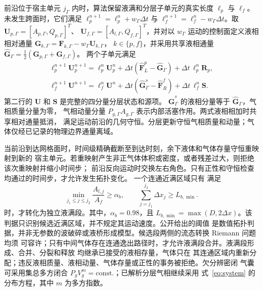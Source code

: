 前沿位于宿主单元 $j_\Gamma$ 内时，算法保留液满和分层子单元的真实长度
$\ell_p$ 与 $\ell_f$。未发生跨面时，它们满足
$\ell_p^{n+1}=\ell_p^n+w_\Gamma\Delta t$ 与
$\ell_f^{n+1}=\ell_f^n-w_\Gamma\Delta t$。取
$\mathbf U_{p,\Gamma}=[A_{p,\Gamma},Q_{p,\Gamma}]^{T}$、
$\mathbf U_{f,\Gamma}=[A_{l,\Gamma},Q_{f,\Gamma}]^{T}$，并对以
$w_\Gamma$ 运动的控制面定义液相相对通量
$\mathbf G_{k,\Gamma}=\mathbf F_{k,\Gamma}-w_\Gamma\mathbf U_{k,\Gamma}$，
$k\in\{p,f\}$，并采用共享液相通量
$\widehat{\mathbf G}_\Gamma=\tfrac12(\mathbf G_{p,\Gamma}+\mathbf G_{f,\Gamma})$。
两个子单元满足
\begin{equation}
\begin{gathered}
\ell_p^{n+1}\mathbf U_p^{n+1}
=\ell_p^n\mathbf U_p^n
+\Delta t(\widehat{\mathbf F}_{L}^{p}
-\widehat{\mathbf G}_\Gamma)
+\Delta t\,\ell_p^n\mathbf R_p,\\[3pt]
\ell_f^{n+1}\mathbf U^{n+1}
=\ell_f^n\mathbf U^n
+\Delta t(\widehat{\mathbf G}_\Gamma^{s}
-\widehat{\mathbf F}_{R}^{f})
+\Delta t\,\ell_f^n\mathbf S.
\end{gathered}
\label{eq:cutcell_update}
\end{equation}
第二行的 $\mathbf U$ 和 $\mathbf S$ 是完整的四分量分层状态和源项。
$\widehat{\mathbf G}_\Gamma^s$ 的液相分量等于 $\widehat{\mathbf G}_\Gamma$，气相质量分量为零，
气相动量分量 $P_{g,\Gamma}A_{g,\Gamma}$ 表示内部活塞作用。两式液相相加时共享相对通量抵消，
满足运动前沿的几何守恒。分层更新守恒气相质量和动量；气体仅经已记录的物理边界通量离域。

当前沿到达网格面时，时间级精确截断至到达时刻，余下液体和\mbox{气体存量}守恒重映射到新的
宿主单元。若重映射产生非正气体体积或密度，或者残差过大，则拒绝该次重映射并缩小时间步；
前沿反向运动时交换左右角色。只有正性和守恒检查均通过的时间步，才允许发生拓扑变化。
一个连通近满区域只有
满足
\begin{equation}
\min_{j_1\le j\le j_2}\frac{A_{l,j}}{A_f}\ge\alpha_b,
\qquad
\sum_{j=j_1}^{j_2}\Delta x_j\ge L_{b,\min}.
\label{eq:topology_criterion}
\end{equation}
时，才转化为独立液满段。其中，$\alpha_b=0.98$，且
$L_{b,\min}=\max(D,2\Delta x)$。该判据只识别候选近满区域，并不规定其运动速度。公开给出的阈值
是数值拓扑判据，并非无参数的波破碎或液桥形成模型。候选段两侧的流态转换 Riemann 问题均须
可容许；只有中间气体存在连通逸出路径时，才允许液满段合并。液满段形成、合并、分裂和释放
均继承已接受的液相存量，气体只在
其连通区域内重新分配；违反液相质量、液相动量、气体存量或正性的事务被拒绝。欠分辨密闭
气囊可采用集总多方闭合 $P_gV_g^m=\mathrm{const.}$；已解析分层气相继续采用
式~\eqref{eq:system} 的分布方程，其中 $m$ 为多方指数。


